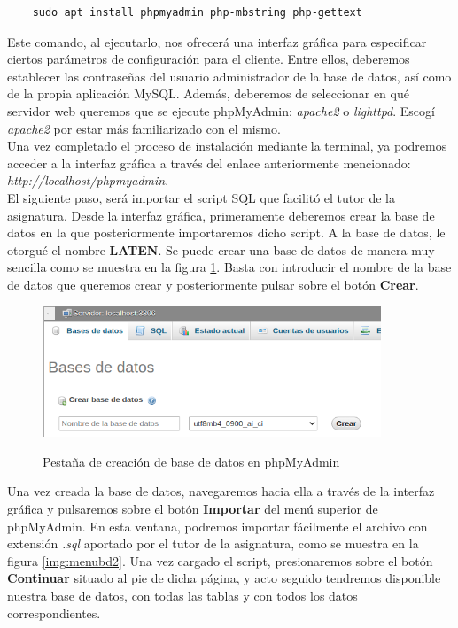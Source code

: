 \begin{lstlisting}
    sudo apt install phpmyadmin php-mbstring php-gettext
\end{lstlisting}

Este comando, al ejecutarlo, nos ofrecerá una interfaz gráfica para especificar ciertos parámetros de configuración para el cliente. Entre ellos, deberemos establecer las contraseñas del usuario administrador de la base de datos, así como de la propia aplicación MySQL. Además, deberemos de seleccionar en qué servidor web queremos que se ejecute phpMyAdmin: \textit{apache2} o \textit{lighttpd}. Escogí \textit{apache2} por estar más familiarizado con el mismo.\\

Una vez completado el proceso de instalación mediante la terminal, ya podremos acceder a la interfaz gráfica a través del enlace anteriormente mencionado: \textit{http://localhost/phpmyadmin}.\\

El siguiente paso, será importar el script SQL que facilitó el tutor de la asignatura. Desde la interfaz gráfica, primeramente deberemos crear la base de datos en la que posteriormente importaremos dicho script. A la base de datos, le otorgué el nombre \textbf{LATEN}. Se puede crear una base de datos de manera muy sencilla como se muestra en la figura \ref{img:menubd1}. Basta con introducir el nombre de la base de datos que queremos crear y posteriormente pulsar sobre el botón \textbf{Crear}.

\begin{figure}[h]
\centering
\includegraphics[width=0.9\textwidth]{logos/menubd1.png}\\[1.4cm]
\caption{Pestaña de creación de base de datos en phpMyAdmin}
\label{img:menubd1}
\end{figure}

Una vez creada la base de datos, navegaremos hacia ella a través de la interfaz gráfica y pulsaremos sobre el botón \textbf{Importar} del menú superior de phpMyAdmin. En esta ventana, podremos importar fácilmente el archivo con extensión \textit{.sql} aportado por el tutor de la asignatura, como se muestra en la figura \ref{img:menubd2}. Una vez cargado el script, presionaremos sobre el botón \textbf{Continuar} situado al pie de dicha página, y acto seguido tendremos disponible nuestra base de datos, con todas las tablas y con todos los datos correspondientes.

